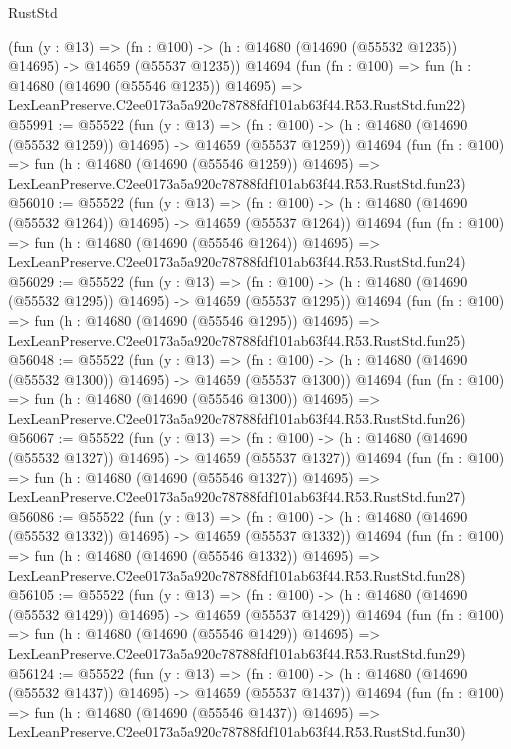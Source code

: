 \begin{lexlean}{RustStd}
\begin{coremodule}
    (fun (y : @13) =>
    (fn : @100) -> (h : @14680 (@14690 (@55532 @1235)) @14695) -> @14659 (@55537 @1235))
    @14694
    (fun (fn : @100) =>
    fun (h : @14680 (@14690 (@55546 @1235)) @14695) =>
    LexLeanPreserve.C2ee0173a5a920c78788fdf101ab63f44.R53.RustStd.fun22)
@55991 := @55522
    (fun (y : @13) =>
    (fn : @100) -> (h : @14680 (@14690 (@55532 @1259)) @14695) -> @14659 (@55537 @1259))
    @14694
    (fun (fn : @100) =>
    fun (h : @14680 (@14690 (@55546 @1259)) @14695) =>
    LexLeanPreserve.C2ee0173a5a920c78788fdf101ab63f44.R53.RustStd.fun23)
@56010 := @55522
    (fun (y : @13) =>
    (fn : @100) -> (h : @14680 (@14690 (@55532 @1264)) @14695) -> @14659 (@55537 @1264))
    @14694
    (fun (fn : @100) =>
    fun (h : @14680 (@14690 (@55546 @1264)) @14695) =>
    LexLeanPreserve.C2ee0173a5a920c78788fdf101ab63f44.R53.RustStd.fun24)
@56029 := @55522
    (fun (y : @13) =>
    (fn : @100) -> (h : @14680 (@14690 (@55532 @1295)) @14695) -> @14659 (@55537 @1295))
    @14694
    (fun (fn : @100) =>
    fun (h : @14680 (@14690 (@55546 @1295)) @14695) =>
    LexLeanPreserve.C2ee0173a5a920c78788fdf101ab63f44.R53.RustStd.fun25)
@56048 := @55522
    (fun (y : @13) =>
    (fn : @100) -> (h : @14680 (@14690 (@55532 @1300)) @14695) -> @14659 (@55537 @1300))
    @14694
    (fun (fn : @100) =>
    fun (h : @14680 (@14690 (@55546 @1300)) @14695) =>
    LexLeanPreserve.C2ee0173a5a920c78788fdf101ab63f44.R53.RustStd.fun26)
@56067 := @55522
    (fun (y : @13) =>
    (fn : @100) -> (h : @14680 (@14690 (@55532 @1327)) @14695) -> @14659 (@55537 @1327))
    @14694
    (fun (fn : @100) =>
    fun (h : @14680 (@14690 (@55546 @1327)) @14695) =>
    LexLeanPreserve.C2ee0173a5a920c78788fdf101ab63f44.R53.RustStd.fun27)
@56086 := @55522
    (fun (y : @13) =>
    (fn : @100) -> (h : @14680 (@14690 (@55532 @1332)) @14695) -> @14659 (@55537 @1332))
    @14694
    (fun (fn : @100) =>
    fun (h : @14680 (@14690 (@55546 @1332)) @14695) =>
    LexLeanPreserve.C2ee0173a5a920c78788fdf101ab63f44.R53.RustStd.fun28)
@56105 := @55522
    (fun (y : @13) =>
    (fn : @100) -> (h : @14680 (@14690 (@55532 @1429)) @14695) -> @14659 (@55537 @1429))
    @14694
    (fun (fn : @100) =>
    fun (h : @14680 (@14690 (@55546 @1429)) @14695) =>
    LexLeanPreserve.C2ee0173a5a920c78788fdf101ab63f44.R53.RustStd.fun29)
@56124 := @55522
    (fun (y : @13) =>
    (fn : @100) -> (h : @14680 (@14690 (@55532 @1437)) @14695) -> @14659 (@55537 @1437))
    @14694
    (fun (fn : @100) =>
    fun (h : @14680 (@14690 (@55546 @1437)) @14695) =>
    LexLeanPreserve.C2ee0173a5a920c78788fdf101ab63f44.R53.RustStd.fun30)

\end{coremodule}
\end{lexlean}
